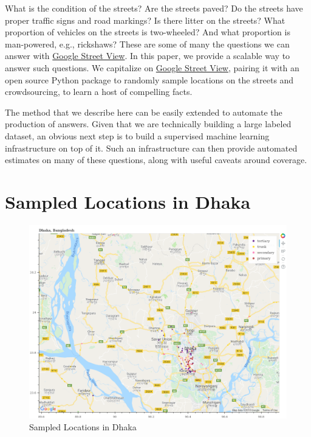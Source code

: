 \documentclass[12pt, letterpaper]{article}
\begin{document}
What is the condition of the streets? Are the streets paved? Do the streets have proper traffic signs and road markings? Is there litter on the streets? What proportion of vehicles on the streets is two-wheeled? And what proportion is man-powered, e.g., rickshaws? These are some of many the questions we can answer with \href{https://www.google.com/streetview/}{Google Street View}. In this paper, we provide a scalable way to answer such questions. We capitalize on \href{https://www.google.com/streetview/}{Google Street View}, pairing it with an open source Python package to randomly sample locations on the streets and crowdsourcing, to learn a host of compelling facts. 

The method that we describe here can be easily extended to automate the production of answers. Given that we are technically building a large labeled dataset, an obvious next step is to build a supervised machine learning infrastructure on top of it. Such an infrastructure can then provide automated estimates on many of these questions, along with useful caveats around coverage.

\clearpage


\clearpage
\appendix


\renewcommand{\thesection}{SI \arabic{section}}
\renewcommand\thetable{\thesection.\arabic{table}}  
\renewcommand\thefigure{\thesection.\arabic{figure}}

\section{Sampled Locations in Dhaka}
\begin{figure}[H]
\centering
\caption{Sampled Locations in Dhaka} \label{fig:google_dhaka}
	\includegraphics[width=\textwidth]{../figs/dhaka-gmap.png}
\end{figure}
\clearpage
\end{document}
